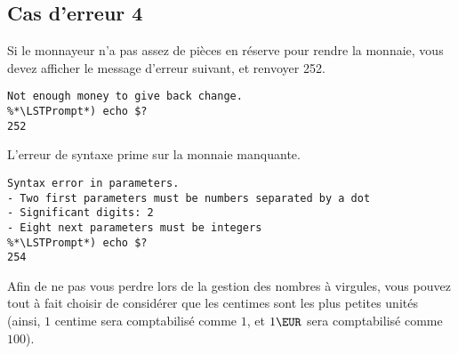 

\newpage

\subsection{Cas d'erreur 4}

\bigskip

\noindent Si le monnayeur n'a pas assez de pièces en réserve pour rendre la monnaie, vous devez afficher le message d'erreur suivant, et renvoyer 252.

\bigskip

\noindent {}

\bigskip

\begin{lstlisting}[frame=single,title={Cas d'erreur 4 (C et Python)}]
%*\LSTPrompt*) ./monnayeur 8.10 10  0 1 0 0 0 0 0 0
Not enough money to give back change.
%*\LSTPrompt*) echo $?
252
\end{lstlisting}

\bigskip

\noindent L'erreur de syntaxe prime sur la monnaie manquante.

\bigskip

\begin{lstlisting}[frame=single,title={Cas d'erreur 2 et 4 (C et Python)}]
%*\LSTPrompt*) ./monnayeur 8,10 10  0 1 0 0 0 0 0 0
Syntax error in parameters.
- Two first parameters must be numbers separated by a dot
- Significant digits: 2
- Eight next parameters must be integers
%*\LSTPrompt*) echo $?
254
\end{lstlisting}



\vspace*{2cm}


\begin{YellowBox}
Afin de ne pas vous perdre lors de la gestion des nombres à virgules, vous pouvez tout à fait choisir de considérer que les centimes sont les plus petites unités (ainsi, $ 1 $ centime sera comptabilisé comme $ 1 $, et $ 1 \EUR $ sera comptabilisé comme $ 100 $).
\end{YellowBox}